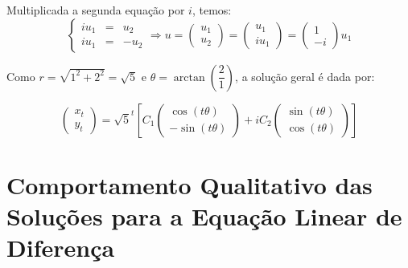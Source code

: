 Multiplicada a segunda equação por $i$, temos:
$$\left\{
\begin{array}{rcl}
iu_1 &=& u_2 \\
iu_1 &=& -u_2
\end{array}\right.
\Rightarrow
u = 
\left(\begin{array}{c} u_1 \\ u_2 \end{array}\right)
= 
\left(\begin{array}{c} u_1 \\ iu_1 \end{array}\right)
= 
\left(\begin{array}{c} 1 \\ -i \end{array}\right) u_1
$$

Como $r = \sqrt{1^2+2^2} = \sqrt{5}$ e $\theta = \arctan\left(\dfrac{2}{1}\right)$, a solução geral é dada por:

$$
\left(\begin{array}{c} x_{t} \\ y_{t} \end{array}\right)
= \sqrt{5}^t
\left[
C_1
\left(\begin{array}{c} \cos(t\theta) \\ -\sin(t\theta) \end{array}\right) 
+
iC_2
\left(\begin{array}{c} \sin(t\theta) \\ \cos(t\theta) \end{array}\right)
\right]
$$








\section{Comportamento Qualitativo das Soluções para a Equação Linear de Diferença}

